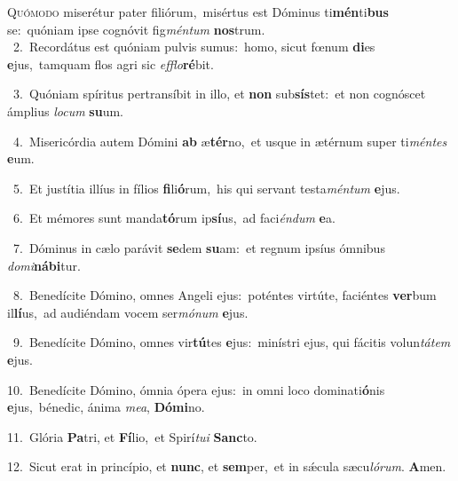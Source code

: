 \lettrine{\initial\textcolor{\initialcolor}{Q}}{uómodo} miserétur pater filiórum,~\dagger misértus est Dóminus ti\-\textbf{mén}\-ti\textbf{bus} se:~\star quóniam ipse cognóvit fig\-\textit{mén}\-\textit{tum} \textbf{nos}\-trum.\\
{\numbfont\textcolor{\numbcolor}{~2.}}~Recordátus est quóniam pulvis sumus:~\dagger homo, sicut fœnum \textbf{di}\-es \textbf{e}\-jus,~\star tamquam flos agri sic \textit{ef}\-\textit{flo}\textbf{ré}bit.\par
{\numbfont\textcolor{\numbcolor}{~3.}}~Quóniam spíritus pertransíbit in illo, et \textbf{non} sub\-\textbf{sís}\-tet:~\star et non cognóscet ámplius \textit{lo}\-\textit{cum} \textbf{su}\-um.\par
{\numbfont\textcolor{\numbcolor}{~4.}}~Misericórdia autem Dómini \textbf{ab} æ\-\textbf{tér}\-no,~\star et usque in ætérnum super ti\-\textit{mén}\-\textit{tes} \textbf{e}\-um.\par
{\numbfont\textcolor{\numbcolor}{~5.}}~Et justítia illíus in fílios \textbf{fi}\-li\-\textbf{ó}\-rum,~\star his qui servant testa\-\textit{mén}\-\textit{tum} \textbf{e}\-jus.\par
{\numbfont\textcolor{\numbcolor}{~6.}}~Et mémores sunt manda\-\textbf{tó}\-rum ip\-\textbf{sí}\-us,~\star ad faci\-\textit{én}\-\textit{dum} \textbf{e}\-a.\par
{\numbfont\textcolor{\numbcolor}{~7.}}~Dóminus in cælo parávit \textbf{se}\-dem \textbf{su}\-am:~\star et regnum ipsíus ómnibus \textit{do}\-\textit{mi}\textbf{ná}\textbf{bi}tur.\par
{\numbfont\textcolor{\numbcolor}{~8.}}~Benedícite Dómino, omnes Angeli ejus:~\dagger poténtes virtúte, faciéntes \textbf{ver}\-bum il\-\textbf{lí}\-us,~\star ad audiéndam vocem ser\-\textit{mó}\-\textit{num} \textbf{e}\-jus.\par
{\numbfont\textcolor{\numbcolor}{~9.}}~Benedícite Dómino, omnes vir\-\textbf{tú}\-tes \textbf{e}\-jus:~\star minístri ejus, qui fácitis volun\-\textit{tá}\-\textit{tem} \textbf{e}\-jus.\par
{\numbfont\textcolor{\numbcolor}{10.}}~Benedícite Dómino, ómnia ópera ejus:~\dagger in omni loco dominati\-\textbf{ó}\-nis \textbf{e}\-jus,~\star bénedic, ánima \textit{me}\-\textit{a}, \textbf{Dó}\-\textbf{mi}no.\par
{\numbfont\textcolor{\numbcolor}{11.}}~Glória \textbf{Pa}\-tri, et \textbf{Fí}\-lio,~\star et Spirí\-\textit{tu}\-\textit{i} \textbf{Sanc}\-to.\par
{\numbfont\textcolor{\numbcolor}{12.}}~Sicut erat in princípio, et \textbf{nunc}\-, et \textbf{sem}\-per,~\star et in sǽcula sæcu\-\textit{ló}\-\textit{rum}. \textbf{A}\-men.\par
